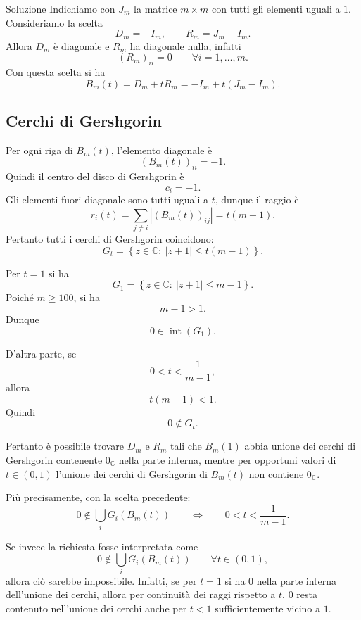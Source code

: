 \documentclass[a4paper]{article}
\begin{document}
\begin{snippetsolution}{Soluzione}
    Indichiamo con \(J_m\) la matrice \(m\times m\) con tutti gli elementi uguali a \(1\). Consideriamo la scelta
    \[
        D_m=-I_m,
        \qquad
        R_m=J_m-I_m.
    \]
    Allora \(D_m\) è diagonale e \(R_m\) ha diagonale nulla, infatti
    \[
        (R_m)_{ii}=0
        \qquad
        \forall i=1,\dots,m.
    \]
    Con questa scelta si ha
    \[
        B_m(t)=D_m+tR_m=-I_m+t(J_m-I_m).
    \]

    \subsection*{Cerchi di Gershgorin}

    Per ogni riga di \(B_m(t)\), l'elemento diagonale è
    \[
        (B_m(t))_{ii}=-1.
    \]
    Quindi il centro del disco di Gershgorin è
    \[
        c_i=-1.
    \]
    Gli elementi fuori diagonale sono tutti uguali a \(t\), dunque il raggio è
    \[
        r_i(t)=\sum_{j\neq i}|(B_m(t))_{ij}|=t(m-1).
    \]
    Pertanto tutti i cerchi di Gershgorin coincidono:
    \[
        G_t=\left\{z\in\mathbb{C}:\ |z+1|\leq t(m-1)\right\}.
    \]

    Per \(t=1\) si ha
    \[
        G_1=\left\{z\in\mathbb{C}:\ |z+1|\leq m-1\right\}.
    \]
    Poiché \(m\geq 100\), si ha
    \[
        m-1>1.
    \]
    Dunque
    \[
        0\in \operatorname{int}(G_1).
    \]

    D'altra parte, se
    \[
        0<t<\frac{1}{m-1},
    \]
    allora
    \[
        t(m-1)<1.
    \]
    Quindi
    \[
        0\notin G_t.
    \]

    Pertanto è possibile trovare \(D_m\) e \(R_m\) tali che \(B_m(1)\) abbia unione dei cerchi di Gershgorin contenente \(0_{\mathbb C}\) nella parte interna, mentre per opportuni valori di \(t\in(0,1)\) l'unione dei cerchi di Gershgorin di \(B_m(t)\) non contiene \(0_{\mathbb C}\).

    Più precisamente, con la scelta precedente:
    \[
        0\notin \bigcup_i G_i(B_m(t))
        \qquad
        \Longleftrightarrow
        \qquad
        0<t<\frac{1}{m-1}.
    \]

    Se invece la richiesta fosse interpretata come
    \[
        0\notin \bigcup_i G_i(B_m(t))
        \qquad
        \forall t\in(0,1),
    \]
    allora ciò sarebbe impossibile. Infatti, se per \(t=1\) si ha \(0\) nella parte interna dell'unione dei cerchi, allora per continuità dei raggi rispetto a \(t\), \(0\) resta contenuto nell'unione dei cerchi anche per \(t<1\) sufficientemente vicino a \(1\).


\end{snippetsolution}
\end{document}
